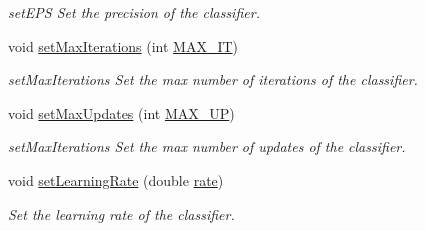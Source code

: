 \begin{DoxyCompactItemize}
\begin{DoxyCompactList}\small\item\em set\+E\+PS Set the precision of the classifier. \end{DoxyCompactList}\item 
void \hyperlink{class_classifier_af3ea28f2e4b7ea19469892ec901b5bb6}{set\+Max\+Iterations} (int \hyperlink{class_classifier_a3b7f1c31910fff58907bcfe2cfc6cf89}{M\+A\+X\+\_\+\+IT})
\begin{DoxyCompactList}\small\item\em set\+Max\+Iterations Set the max number of iterations of the classifier. \end{DoxyCompactList}\item 
void \hyperlink{class_classifier_a343905df8798ef1e29983d4582a1cdb6}{set\+Max\+Updates} (int \hyperlink{class_classifier_a8d3289755d689efa65ca009d4c4ffa13}{M\+A\+X\+\_\+\+UP})
\begin{DoxyCompactList}\small\item\em set\+Max\+Iterations Set the max number of updates of the classifier. \end{DoxyCompactList}\item 
void \hyperlink{class_classifier_ae705171568ea2066b619609af614129e}{set\+Learning\+Rate} (double \hyperlink{class_classifier_a7b1c4ef87631bd9e46682e5bc4315111}{rate})
\begin{DoxyCompactList}\small\item\em Set the learning rate of the classifier. \end{DoxyCompactList}\end{DoxyCompactItemize}
